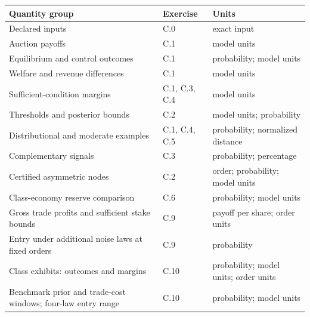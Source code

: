 \documentclass[
  11pt,
]{article}
\newcounter{none} %
\begin{document}
{\def\LTcaptype{none} %
\begin{longtable}[]{@{}
  >{\raggedright\arraybackslash}p{}
  >{\raggedright\arraybackslash}p{}
  >{\raggedright\arraybackslash}p{}@{}}
\toprule\noalign{}
\begin{minipage}[b]{\linewidth}\raggedright
Quantity group
\end{minipage} & \begin{minipage}[b]{\linewidth}\raggedright
Exercise
\end{minipage} & \begin{minipage}[b]{\linewidth}\raggedright
Units
\end{minipage} \\
\midrule\noalign{}
\endhead
\bottomrule\noalign{}
\endlastfoot
Declared inputs & C.0 & exact input \\
Auction payoffs & C.1 & model units \\
Equilibrium and control outcomes & C.1 & probability; model units \\
Welfare and revenue differences & C.1 & model units \\
Sufficient-condition margins & C.1, C.3, C.4 & model units \\
Thresholds and posterior bounds & C.2 & model units; probability \\
Distributional and moderate examples & C.1, C.4, C.5 & probability;
normalized distance \\
Complementary signals & C.3 & probability; percentage \\
Certified asymmetric nodes & C.2 & order; probability; model units \\
Class-economy reserve comparison & C.6 & probability; model units \\
Gross trade profits and sufficient stake bounds & C.9 & payoff per
share; order units \\
Entry under additional noise laws at fixed orders & C.9 & probability \\
Class exhibits: outcomes and margins & C.10 & probability; model units;
order units \\
Benchmark prior and trade-cost windows; four-law entry range & C.10 &
probability; model units \\
\end{longtable}
}
\end{document}
